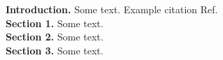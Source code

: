 \noindent \textbf{Introduction.} Some text. Example citation Ref.~\cite{example}\\

\noindent \textbf{Section 1.} Some text.\\

\noindent \textbf{Section 2.} Some text.\\

\noindent \textbf{Section 3.} Some text.\\

{\footnotesize
  

}